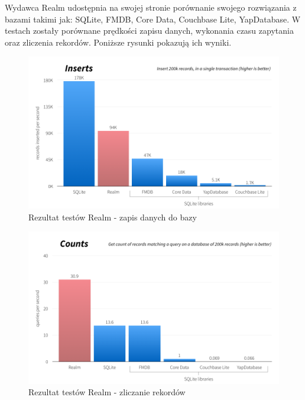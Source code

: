 Wydawca Realm udostępnia na swojej stronie porównanie swojego rozwiązania z bazami takimi jak: SQLite, FMDB, Core Data, Couchbase Lite, YapDatabase. W testach zostały porównane prędkości zapisu danych, wykonania czasu zapytania oraz zliczenia rekordów. Poniższe rysunki pokazują ich wyniki. \par

\begin{figure}[h]
\centering
	\includegraphics[width=\linewidth]{img/realm_insert_test.png}
	\caption{Rezultat testów Realm - zapis danych do bazy}
	\label{fig: realm_insert_test}
\end{figure}

\begin{figure}
\centering
	\includegraphics[width=\linewidth]{img/realm_count_test.png}
	\caption{Rezultat testów Realm - zliczanie rekordów}
	\label{fig: realm_count_test}
\end{figure}

